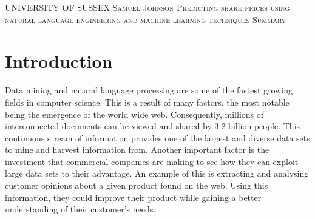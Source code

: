 \documentclass[a4paper,11pt]{report}
\newcommand{\linespacing}{1.5}
\renewcommand{\baselinestretch}{\linespacing}
\begin{document}
\thispagestyle{empty}
\newpage
\null\vskip10mm
\begin{center}
\large
\underline{UNIVERSITY OF SUSSEX}
\vskip20mm
\textsc{Samuel Johnson}
\vskip20mm
\underline{\textsc{Predicting share prices using natural language engineering and machine learning techniques}}
\vskip0mm
\vskip20mm
\underline{\textsc{Summary}}
\vskip2mm
\end{center}
\renewcommand{\baselinestretch}{1.0}
\small\normalsize





\newpage
{}
\tableofcontents
\listoftables
{}
{}
\listoffigures
{}
{}


\newpage
{}



\chapter{Introduction}
\label{chap:intro}

Data mining and natural language processing are some of the fastest growing fields in computer science. This is a result of many factors, the most notable being the emergence of the world wide web.  Consequently, millions of interconnected documents can be viewed and shared by 3.2 billion people. This continuous stream of information provides one of the largest and diverse data sets to mine and harvest information from. Another important factor is the investment that commercial companies are making to see how they can exploit large data sets to their advantage. An example of this is extracting and analysing customer opinions about a given product found on the web. Using this information, they could improve their product while gaining a better understanding of their customer's needs.
\end{document}
